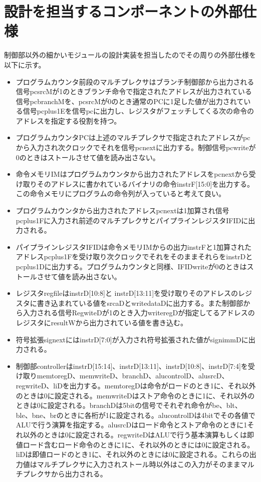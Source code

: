 \documentclass[a4paper,11pt,oneside,openany]{jsarticle}
\begin{document}
\section{設計を担当するコンポーネントの外部仕様}
制御部以外の細かいモジュールの設計実装を担当したのでその周りの外部仕様を以下に示す。\\
\begin{itemize}
\item プログラムカウンタ前段のマルチプレクサはブランチ制御部から出力される信号pcsrcMが1のときブランチ命令で指定されたアドレスが出力されている信号pcbranchMを、pcsrcMが0のとき通常のPCに1足した値が出力されている信号pcplus1Eを信号pcに出力し、レジスタがフェッチしてくる次の命令のアドレスを指定する役割を持つ。
\item プログラムカウンタPCは上述のマルチプレクサで指定されたアドレスがpcから入力され次クロックでそれを信号pcnextに出力する。制御信号pcwriteが0のときはストールさせて値を読み出さない。
\item 命令メモリIMはプログラムカウンタから出力されたアドレスをpcnextから受け取りそのアドレスに書かれているバイナリの命令instrF[15:0]を出力する。この命令メモリにプログラムの命令列が入っていると考えて良い。
\item プログラムカウンタから出力されたアドレスpcnextは1加算され信号pcplus1Fに入力され前述のマルチプレクサとパイプラインレジスタIFIDに出力される。
\item パイプラインレジスタIFIDは命令メモリIMからの出力instrFと1加算されたアドレスpcplus1Fを受け取り次クロックでそれをそのままそれらをinstrDとpcplus1Dに出力する。プログラムカウンタと同様、IFIDwriteが0のときはストールさせて値を読み出さない。
\item レジスタregfileはinstrD[10:8]と instrD[13:11]を受け取りそのアドレスのレジスタに書き込まれている値をsrcaDとwritedataDに出力する。また制御部から入力される信号RegwiteDが1のとき入力writeregDが指定してるアドレスのレジスタにresultWから出力されている値を書き込む。
\item 符号拡張signextにはinstrD[7:0]が入力され符号拡張された値がsignimmDに出力される。
 \item 制御部controllerはinstrD[15:14]、instrD[13:11]、instrD[10:8]、instrD[7:4]を受け取りmemtoregD、memwriteD、branchD、alucontrolD、alusrcD、regwriteD、liDを出力する。memtoregDは命令がロードのとき1に、それ以外のときは0に設定される。memwriteDはストア命令のときに1に、それ以外のときは0に設定される。branchDは5bitの信号でそれぞれ命令がbe、blt、ble、bne、brのときに各桁が1に設定される。alucontrolDは4bitでその各値でALUで行う演算を指定する。alusrcDはロード命令とストア命令のときに1それ以外のときは0に設定される。regwriteDはALUで行う基本演算もしくは即値ロード含むロード命令のときに1に、それ以外のときには0に設定される。liDは即値ロードのとき1に、それ以外のときには0に設定される。これらの出力値はマルチプレクサに入力されストール時以外はこの入力がそのままマルチプレクサから出力される。

\end{itemize}
\end{document}
